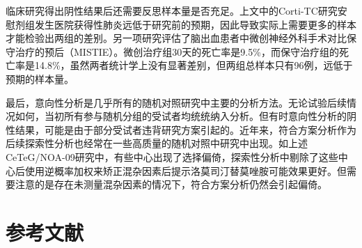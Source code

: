 \documentclass[
  chinese-hans,
  letterpaper,
  DIV=11,
  numbers=noendperiod]{scrreprt}
\begin{document}
临床研究得出阴性结果后还需要反思样本量是否充足。上文中的Corti-TC研究安慰剂组发生医院获得性肺炎远低于研究前的预期，因此导致实际上需要更多的样本才能检验出两组的差别。另一项研究评估了脑出血患者中微创神经外科手术对比保守治疗的预后（MISTIE）。微创治疗组30天的死亡率是9.5\%，而保守治疗组的死亡率是14.8\%，虽然两者统计学上没有显著差别，但两组总样本只有96例，远低于预期的样本量。

最后，意向性分析是几乎所有的随机对照研究中主要的分析方法。无论试验后续情况如何，当初所有参与随机分组的受试者均统统纳入分析。但有时意向性分析的阴性结果，可能是由于部分受试者违背研究方案引起的。近年来，符合方案分析作为后续探索性分析也经常在一些高质量的随机对照中研究中出现。如上述CeTeG/NOA-09研究中，有些中心出现了选择偏倚，探索性分析中剔除了这些中心后使用逆概率加权来矫正混杂因素后提示洛莫司汀替莫唑胺可能效果更好。但需要注意的是存在未测量混杂因素的情况下，符合方案分析仍然会引起偏倚。

\section{参考文献}\label{ux53c2ux8003ux6587ux732e-1}
\end{document}
